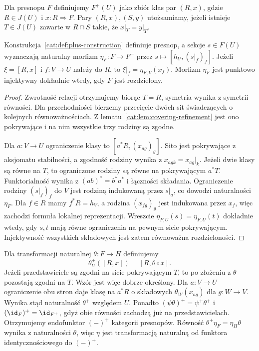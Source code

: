\begin{definicja}[Konstrukcja $F^+$]\label{cat:def:plus-construction}
Dla presnopu $F$ definiujemy $F^+(U)$ jako zbiór klas par $(R,x)$, gdzie $R\in J(U)$ i $x:R\Rightarrow F$. Pary $(R,x),(S,y)$ utożsamiamy, jeżeli istnieje $T\in J(U)$ zawarte w $R\cap S$ takie, że $x|_T=y|_T$.
\end{definicja}

\begin{lemat}\label{cat:lem:plus-presheaf}
Konstrukcja~\ref{cat:def:plus-construction} definiuje presnop, a sekcje $s\in F(U)$ wyznaczają naturalny morfizm $\eta_F:F\to F^+$ przez $s\mapsto[h_U,(s|_f)_f]$. Jeżeli $\xi=[R,x]$ i $f:V\to U$ należy do $R$, to $\xi|_f=\eta_{F,V}(x_f)$. Morfizm $\eta_F$ jest punktowo injektywny dokładnie wtedy, gdy $F$ jest rozdzielony.
\end{lemat}
\begin{proof}
Zwrotność relacji otrzymujemy biorąc $T=R$, symetria wynika z symetrii równości. Dla przechodniości bierzemy przecięcie dwóch sit świadczących o kolejnych równoważnościach. Z lematu~\ref{cat:lem:covering-refinement} jest ono pokrywające i na nim wszystkie trzy rodziny są zgodne.

Dla $a:V\to U$ ograniczenie klasy to $[a^*R,(x_{ag})_g]$. Sito jest pokrywające z aksjomatu stabilności, a zgodność rodziny wynika z $x_{agk}=x_{ag}|_k$. Jeżeli dwie klasy są równe na $T$, to ograniczone rodziny są równe na pokrywającym $a^*T$. Funktorialność wynika z $(ab)^*=b^*a^*$ i łączności składania. Ograniczenie rodziny $(s|_f)_f$ do $V$ jest rodziną indukowaną przez $s|_a$, co dowodzi naturalności $\eta_F$. Dla $f\in R$ mamy $f^*R=h_V$, a rodzina $(x_{fg})_g$ jest indukowana przez $x_f$, więc zachodzi formuła lokalnej reprezentacji. Wreszcie $\eta_{F,U}(s)=\eta_{F,U}(t)$ dokładnie wtedy, gdy $s,t$ mają równe ograniczenia na pewnym sicie pokrywającym. Injektywność wszystkich składowych jest zatem równoważna rozdzieloności.
\end{proof}

Dla transformacji naturalnej $\theta:F\to H$ definiujemy
\[
 \theta^+_U([R,x])=[R,\theta\circ x].
\]
Jeżeli przedstawiciele są zgodni na sicie pokrywającym $T$, to po złożeniu z $\theta$ pozostają zgodni na $T$. Wzór jest więc dobrze określony. Dla $a:V\to U$ ograniczenie obu stron daje klasę na $a^*R$ o składowych $\theta_W(x_{ag})$ dla $g:W\to V$. Wynika stąd naturalność $\theta^+$ względem $U$. Ponadto $(\psi\theta)^+=\psi^+\theta^+$ i $(\id_F)^+=\id_{F^+}$, gdyż obie równości zachodzą już na przedstawicielach. Otrzymujemy endofunktor $(-)^+$ kategorii presnopów. Równość $\theta^+\eta_F=\eta_H\theta$ wynika z naturalności $\theta$, więc $\eta$ jest transformacją naturalną od funktora identycznościowego do $(-)^+$.

